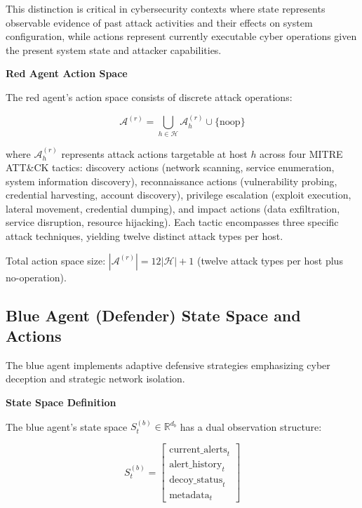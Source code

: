 \documentclass[12pt,oneside]{article}
\begin{document}
This distinction is critical in cybersecurity contexts where state represents observable evidence of past attack activities and their effects on system configuration, while actions represent currently executable cyber operations given the present system state and attacker capabilities.

\textbf{Red Agent Action Space}

The red agent's action space consists of discrete attack operations:

\begin{equation}
\mathcal{A}^{(r)} = \bigcup_{h \in \mathcal{H}} \mathcal{A}^{(r)}_h \cup \{\text{noop}\}
\end{equation}

where $\mathcal{A}^{(r)}_h$ represents attack actions targetable at host $h$ across four MITRE ATT\&CK tactics: discovery actions (network scanning, service enumeration, system information discovery), reconnaissance actions (vulnerability probing, credential harvesting, account discovery), privilege escalation (exploit execution, lateral movement, credential dumping), and impact actions (data exfiltration, service disruption, resource hijacking). Each tactic encompasses three specific attack techniques, yielding twelve distinct attack types per host.

Total action space size: $|\mathcal{A}^{(r)}| = 12|\mathcal{H}| + 1$ (twelve attack types per host plus no-operation).

\subsection{Blue Agent (Defender) State Space and Actions}

The blue agent implements adaptive defensive strategies emphasizing cyber deception and strategic network isolation.

\textbf{State Space Definition}

The blue agent's state space $S^{(b)}_t \in \mathbb{R}^{d_b}$ has a dual observation structure:

\begin{equation}
S^{(b)}_t = \begin{bmatrix}
\text{current\_alerts}_t \\
\text{alert\_history}_t \\
\text{decoy\_status}_t \\
\text{metadata}_t
\end{bmatrix}
\end{equation}
\end{document}
